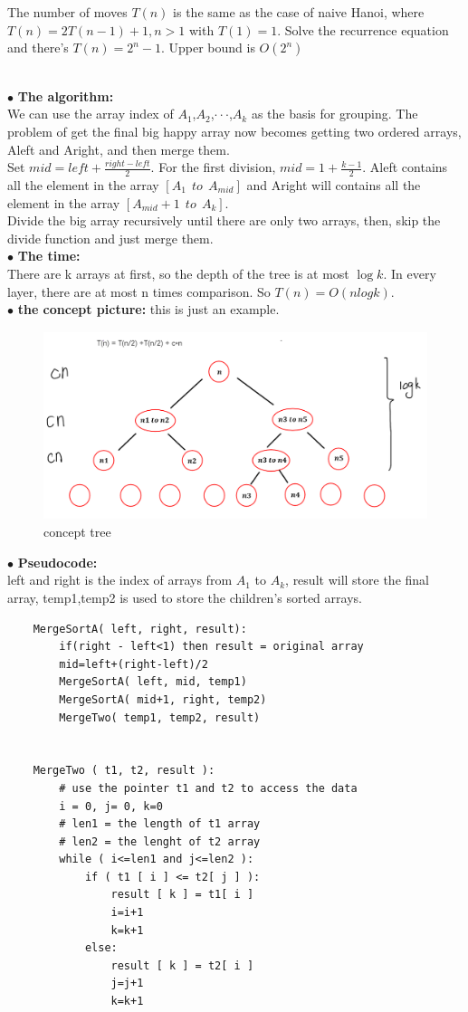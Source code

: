 \documentclass[12pt,a4paper]{article}
\newcommand{\question}[1]{\bigskip\noindent{\textbf{Q{#1} solution}}}
\begin{document}
The number of moves $T(n)$ is the same as the case of naive Hanoi, where $T(n) = 2T(n - 1) + 1, n > 1$ with $T(1) = 1$. Solve the recurrence equation and there's $T(n) = 2^n - 1$. Upper bound is $O(2^n)$


\question{14.A}\\
$\bullet$ \textbf{The algorithm:}\\
We can use the array index of $A_1$,$A_2$,$\cdot \cdot \cdot$,$A_k$ as the basis for grouping. The problem of get the final big happy array now becomes getting two ordered arrays, Aleft and Aright, and then merge them.\\
Set $mid = left+\frac{right-left}{2}$. For the first division, $mid = 1+\frac{k-1}{2}$. Aleft contains all the element in the array $[A_1 \ \ to \ \ A_{mid}]$ and Aright will contains all the element in the array $[A_{mid}+1 \ \ to \ \ A_k]$.\\
Divide the big array recursively until there are only two arrays, then, skip the divide function and just merge them.\\
$\bullet$ \textbf{The time:}\\
There are k arrays at first, so the depth of the tree is at most $\log{k}$. In every layer, there are at most n times comparison. So $T(n) = O(nlogk)$.\\
$\bullet$ \textbf{the concept picture:} this is just an example.
	\begin{figure}[H]
	\centering %
	\includegraphics[height=5.5cm,width=12.5cm]{picture//Q14A.png}
	\caption{concept tree}
	\end{figure}
\noindent
$\bullet$ \textbf{Pseudocode:}\\
	left and right is the index of arrays from $A_1$ to $A_k$, result will store the final array, temp1,temp2 is used to store the children's sorted arrays.
	\begin{lstlisting}
	MergeSortA( left, right, result):
		if(right - left<1) then result = original array
		mid=left+(right-left)/2
		MergeSortA( left, mid, temp1)
		MergeSortA( mid+1, right, temp2)
		MergeTwo( temp1, temp2, result)


	MergeTwo ( t1, t2, result ):
		# use the pointer t1 and t2 to access the data
		i = 0, j= 0, k=0
		# len1 = the length of t1 array
		# len2 = the lenght of t2 array
		while ( i<=len1 and j<=len2 ):
			if ( t1 [ i ] <= t2[ j ] ):
				result [ k ] = t1[ i ]
				i=i+1
				k=k+1
			else:
				result [ k ] = t2[ i ]
				j=j+1
				k=k+1
	\end{lstlisting}
\end{document}
